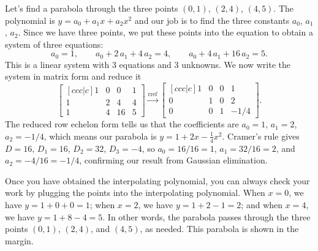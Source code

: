 \begin{example}
Let's find a parabola through the three points $(0, 1)$, $(2, 4)$, $(4, 5)$.  The polynomial is $y=a_0 +a_1 x+a_2 x^2$ and our job is to find the three constants $a_0$,  $a_1$, $a_2$.  Since we have three points, we put these points into the equation to obtain a system of three equations:
$$
a_{{0}}=1, \quad \quad 
a_{{0}}+2\,a_{{1}}+4\,a_{{2}}=4, \quad \quad 
a_{{0}}+4\,a_{{1}}+16\,a_{{2}}=5.
$$
This is a linear system with 3 equations and 3 unknowns.  We now write the system in matrix form and reduce it
$$
\begin{bmatrix}[ccc|c] 
1&0&0&1\\
1&2&4&4\\
1&4&16&5
\end {bmatrix}
\xrightarrow{\text{rref}}
\begin{bmatrix}[ccc|c]
1&0&0&1\\
0&1&0&2\\
0&0&1&-1/4
\end {bmatrix} 
.$$
The reduced row echelon form tells us that the coefficients are $a_0 = 1$, $a_1= 2$, $a_2=-1/4$, which means our parabola is $y=1+2 x- \frac 14 x^2$. Cramer's rule gives $D=16$, $D_1=16$, $D_2=32$, $D_3=-4$, so $a_0 = 16/16=1$, $a_1=32/16=2$, and $a_2=-4/16=-1/4$, confirming our result from Gaussian elimination.

%
%
Once you have obtained the interpolating polynomial, you can always check your work by plugging the points into the interpolating polynomial. When $x=0$, we have $y=1+0+0=1$; when $x=2$, we have $y=1+2-1=2$; and when $x=4$, we have $y=1+8-4=5$.  In other words,  the parabola passes through the three points $(0,1)$, $(2,4)$, and $(4,5)$, as needed.  This parabola is shown in the margin.  
\end{example}


